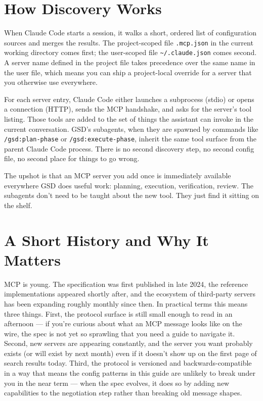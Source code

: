 \documentclass[11pt,letterpaper,openany]{book}
\begin{document}
\section{How Discovery Works}

When Claude Code starts a session, it walks a short, ordered list of
configuration sources and merges the results. The project-scoped file
\texttt{.mcp.json} in the current working directory comes first; the
user-scoped file \texttt{\~{}/.claude.json} comes second. A server name
defined in the project file takes precedence over the same name in the
user file, which means you can ship a project-local override for a
server that you otherwise use everywhere.

For each server entry, Claude Code either launches a subprocess (stdio)
or opens a connection (HTTP), sends the MCP handshake, and asks for the
server's tool listing. Those tools are added to the set of things the
assistant can invoke in the current conversation. GSD's subagents, when
they are spawned by commands like \texttt{/gsd:plan-phase} or
\texttt{/gsd:execute-phase}, inherit the same tool surface from the
parent Claude Code process. There is no second discovery step, no second
config file, no second place for things to go wrong.

The upshot is that an MCP server you add once is immediately available
everywhere GSD does useful work: planning, execution, verification,
review. The subagents don't need to be taught about the new tool. They
just find it sitting on the shelf.

\section{A Short History and Why It Matters}

MCP is young. The specification was first published in late 2024, the
reference implementations appeared shortly after, and the ecosystem of
third-party servers has been expanding roughly monthly since then. In
practical terms this means three things. First, the protocol surface
is still small enough to read in an afternoon --- if you're curious
about what an MCP message looks like on the wire, the spec is not yet
so sprawling that you need a guide to navigate it. Second, new
servers are appearing constantly, and the server you want probably
exists (or will exist by next month) even if it doesn't show up on
the first page of search results today. Third, the protocol is
versioned and backwards-compatible in a way that means the config
patterns in this guide are unlikely to break under you in the near
term --- when the spec evolves, it does so by adding new capabilities
to the negotiation step rather than breaking old message shapes.
\end{document}
